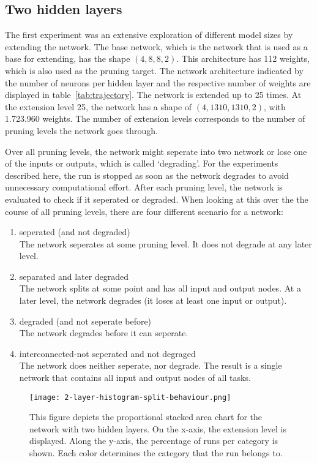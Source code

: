 \subsection{Two hidden layers}\label{two-hidden}
The first experiment was an extensive exploration of different model sizes by extending the network.
The base network, which is the network that is used as a base for extending, has the shape $(4,8,8,2)$.
This architecture has 112 weights, which is also used as the pruning target.
The network architecture indicated by the number of neurons per hidden layer and the respective number of weights are displayed in table~\ref{tab:trajectory}.
The network is extended up to 25 times.
At the extension level 25, the network has a shape of $(4,1310,1310,2)$, with 1.723.960 weights.
The number of extension levels corresponds to the number of pruning levels the network goes through.

Over all pruning levels, the network might seperate into two network or lose one of the inputs or outputs, which is called `degrading'.
For the experiments described here, the run is stopped as soon as the network degrades to avoid unnecessary computational effort.
After each pruning level, the network is evaluated to check if it seperated or degraded.
When looking at this over the the course of all pruning levels, there are four different scenario for a network:

\begin{enumerate}
    \item seperated (and not degraded)\\
    The network seperates at some pruning level. 
    It does not degrade at any later level. 
    \item separated and later degraded \\
    The network splits at some point and has all input and output nodes.
    At a later level, the network degrades (it loses at least one input or output).
    \item degraded (and not seperate before) \\
    The network degrades before it can seperate.
    \item interconnected-not seperated and not degraged \\
    The network does neither seperate, nor degrade. 
    The result is a single network that contains all input and output nodes of all tasks.
\end{enumerate}

\begin{figure}[ht]
    \centering
    \texttt{[image: 2-layer-histogram-split-behaviour.png]}
    \caption{
        This figure depicts the proportional stacked area chart for the network with two hidden layers.
        On the x-axis, the extension level is displayed. 
        Along the y-axis, the percentage of runs per category is shown.
        Each color determines the category that the run belongs to.
        }\label{fig:2laxer-histogram}
\end{figure}

